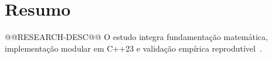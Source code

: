 \section{Resumo}\label{sec:resumo}

@@RESEARCH-DESC@@ O estudo integra fundamentação matemática, implementação modular em C++23 e validação empírica reprodutível~\cite{cormen2022introduction, korte2018combinatorial}.

